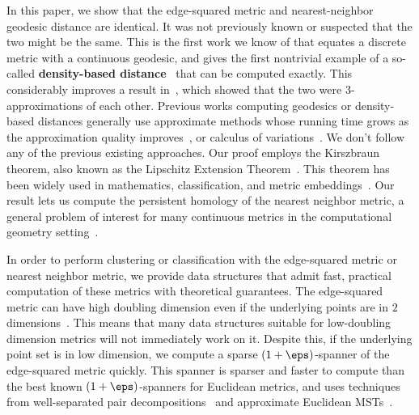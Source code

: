 
In this paper, we show that the edge-squared metric and nearest-neighbor
geodesic distance are
identical. It was not previously known or
suspected that the two might be the same. This is the
first work we know of that equates a discrete metric with a
continuous geodesic, and gives the first nontrivial example of a
so-called \textbf{density-based distance}~\cite{sajama05estimatingDBDM} that can
be computed exactly. This considerably improves a result
in~\cite{cohen15approximating}, which showed that the two were
$3$-approximations of each other. Previous works computing
geodesics or density-based distances generally use approximate
methods whose running time grows as the approximation
quality improves~\cite{Kimmel98, tenenbaum00global,
alamgir12shortest, agarwal16efficient, hwang2016,
cohen15approximating}, or
calculus of variations~\cite{bernoulli, Schwarzschild, Sussmann97}.
We don't follow any of the previous existing approaches. Our proof employs
the Kirszbraun theorem, also known as the Lipschitz
Extension Theorem~\cite{Kirszbraun1934, brehm1981}. This theorem has been
widely used in mathematics, classification, and metric
embeddings~\cite{Naor06, Lee05, Naor15, Gottlieb14, Gottlieb17}.
Our result lets us compute the persistent
homology of the nearest neighbor metric, a general problem of interest for
many continuous metrics in the computational geometry
setting~\cite{edelsbrunner02topological,gasparovic17complete,chazal08towards,chazal13persistence,carlsson09topology}.

In order to perform clustering or classification with the edge-squared
metric or nearest neighbor metric, we
provide data structures that admit fast, practical
computation of these metrics with theoretical guarantees. The
edge-squared metric can have high doubling
dimension even if the underlying points are in $2$
dimensions~\cite{cohen15approximating}. This
means that many data structures suitable for low-doubling dimension
metrics will not immediately
work on it. Despite this, if the underlying point set is in low dimension,
we compute a sparse $(1+\eps)$-spanner of
the edge-squared metric quickly.
This spanner is sparser and faster to compute than the
best known $(1+\eps)$-spanners for Euclidean metrics, and uses
techniques from well-separated pair
decompositions~\cite{Callahan1993} and
approximate Euclidean MSTs~\cite{arya95euclid, Arya2016,
Callahan1995}.


